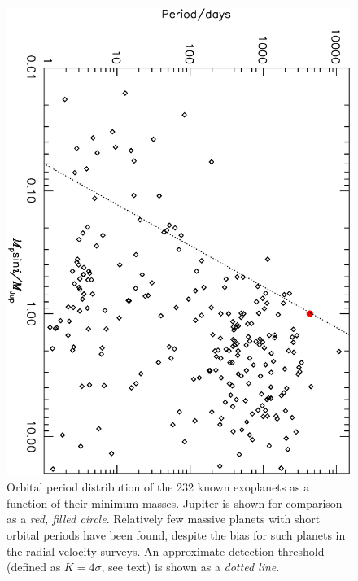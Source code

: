 \begin{figure}
\begin{center}
\centering
\includegraphics[angle=90,width=.90\textwidth]{1_rvplanets}
\caption[Orbital period distribution of the 232 known exoplanets]{%
Orbital period distribution of the 232 known exoplanets as a function of their minimum masses.
Jupiter is shown for comparison as a {\it red, filled circle}.
Relatively few massive planets with short orbital periods have been found, despite the bias for such planets in the radial-velocity surveys. 
An approximate detection threshold (defined as $K=4\sigma$, see text) is shown as a {\it dotted line}.%
}
\label{cha:intro:sec:methods:sub:rv:fig:rv}
\end{center}
\end{figure}

